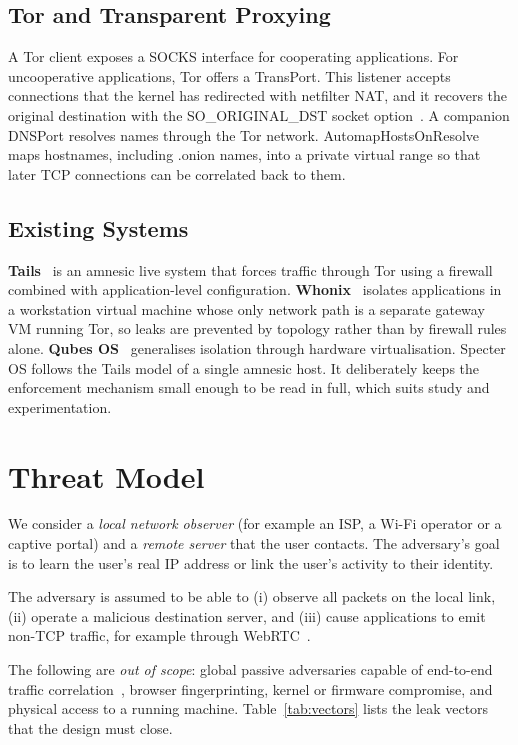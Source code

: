 \documentclass[10pt,twocolumn,a4paper]{article}
\DeclareRobustCommand{\texttt}[1]{\mbox{\ttfamily #1}}
\begin{document}
\subsection{Tor and Transparent Proxying}
A Tor client exposes a SOCKS interface for cooperating applications.
For uncooperative applications, Tor offers a \texttt{TransPort}. This
listener accepts connections that the kernel has redirected with
\texttt{netfilter} NAT, and it recovers the original destination with
the \texttt{SO\_ORIGINAL\_DST} socket option~\cite{torproject2024transparent}.
A companion \texttt{DNSPort} resolves names through the Tor network.
\texttt{AutomapHostsOnResolve} maps hostnames, including
\texttt{.onion} names, into a private virtual range so that later TCP
connections can be correlated back to them.

\subsection{Existing Systems}
\textbf{Tails}~\cite{tails} is an amnesic live system that forces
traffic through Tor using a firewall combined with application-level
configuration. \textbf{Whonix}~\cite{whonix} isolates applications in a
workstation virtual machine whose only network path is a separate
gateway VM running Tor, so leaks are prevented by topology rather than
by firewall rules alone. \textbf{Qubes OS}~\cite{qubes} generalises
isolation through hardware virtualisation. Specter OS follows the Tails
model of a single amnesic host. It deliberately keeps the enforcement
mechanism small enough to be read in full, which suits study and
experimentation.

\section{Threat Model}
\label{sec:threat}

We consider a \emph{local network observer} (for example an ISP, a Wi-Fi
operator or a captive portal) and a \emph{remote server} that the user
contacts. The adversary's goal is to learn the user's real IP address
or link the user's activity to their identity.

The adversary is assumed to be able to (i) observe all packets on the
local link, (ii) operate a malicious destination server, and (iii)
cause applications to emit non-TCP traffic, for example through
WebRTC~\cite{webrtcleak}.

The following are \emph{out of scope}: global passive adversaries
capable of end-to-end traffic correlation~\cite{murdoch2005low}, browser
fingerprinting, kernel or firmware compromise, and physical access to a
running machine. Table~\ref{tab:vectors} lists the leak vectors that the
design must close.
\end{document}

